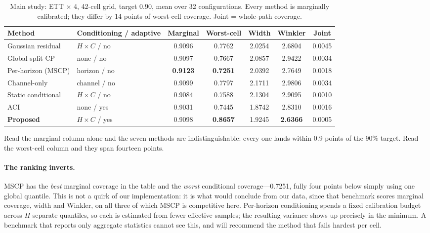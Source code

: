 \documentclass[11pt]{article}
\begin{document}
\begin{table}[t]\centering\small
\caption{Main study: ETT $\times$ 4, 42-cell grid, target 0.90, mean over 32 configurations. Every method is marginally calibrated; they differ by 14 points of worst-cell coverage. Joint = whole-path coverage.}
\label{tab:main}
\begin{tabular}{llccccc}
\toprule
Method & Conditioning / adaptive & Marginal & Worst-cell & Width & Winkler & Joint\\
\midrule
Gaussian residual & $H\times C$ / no & 0.9096 & 0.7762 & 2.0254 & 2.6804 & 0.0045\\
Global split CP & none / no & 0.9097 & 0.7667 & 2.0857 & 2.9422 & 0.0034\\
Per-horizon (MSCP) & horizon / no & \textbf{0.9123} & \textbf{0.7251} & 2.0392 & 2.7649 & 0.0018\\
Channel-only & channel / no & 0.9099 & 0.7797 & 2.1711 & 2.9806 & 0.0034\\
Static conditional & $H\times C$ / no & 0.9084 & 0.7588 & 2.1304 & 2.9095 & 0.0010\\
ACI & none / yes & 0.9031 & 0.7445 & 1.8742 & 2.8310 & 0.0016\\
\textbf{Proposed} & $H\times C$ / yes & 0.9098 & \textbf{0.8657} & 1.9245 & \textbf{2.6366} & 0.0005\\
\bottomrule
\end{tabular}
\end{table}

Read the marginal column alone and the seven methods are indistinguishable: every one lands within 0.9 points of the 90\% target. Read the worst-cell column and they span fourteen points.

\paragraph{The ranking inverts.} MSCP has the \emph{best} marginal coverage in the table and the \emph{worst} conditional coverage---0.7251, fully four points below simply using one global quantile. This is not a quirk of our implementation: it is what \citet{cpsurvey} would conclude from our data, since that benchmark scores marginal coverage, width and Winkler, on all three of which MSCP is competitive here. Per-horizon conditioning spends a fixed calibration budget across $H$ separate quantiles, so each is estimated from fewer effective samples; the resulting variance shows up precisely in the minimum. A benchmark that reports only aggregate statistics cannot see this, and will recommend the method that fails hardest per cell.
\end{document}
